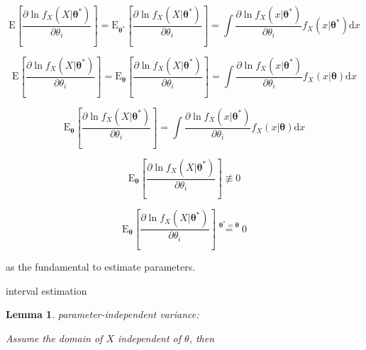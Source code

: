 \documentclass[
]{book}
\newtheorem{lemma}{Lemma}[chapter]
\theoremstyle{definition}
\theoremstyle{definition}
\theoremstyle{definition}
\theoremstyle{definition}
\theoremstyle{remark}
\begin{document}
\[
\mathrm{E}\left[\dfrac{\partial\ln f_{{\scriptscriptstyle X}}\left(X|\boldsymbol{\theta}^{*}\right)}{\partial\theta_{{\scriptscriptstyle i}}}\right]=\mathrm{E}_{{\scriptscriptstyle \boldsymbol{\theta}^{*}}}\left[\dfrac{\partial\ln f_{{\scriptscriptstyle X}}\left(X|\boldsymbol{\theta}^{*}\right)}{\partial\theta_{{\scriptscriptstyle i}}}\right]=\int\dfrac{\partial\ln f_{{\scriptscriptstyle X}}\left(x|\boldsymbol{\theta}^{*}\right)}{\partial\theta_{{\scriptscriptstyle i}}}f_{{\scriptscriptstyle X}}\left(x|\boldsymbol{\theta}^{*}\right)\mathrm{d}x
\]

\[
\mathrm{E}\left[\dfrac{\partial\ln f_{{\scriptscriptstyle X}}\left(X|\boldsymbol{\theta}^{*}\right)}{\partial\theta_{{\scriptscriptstyle i}}}\right]=\mathrm{E}_{{\scriptscriptstyle \boldsymbol{\theta}}}\left[\dfrac{\partial\ln f_{{\scriptscriptstyle X}}\left(X|\boldsymbol{\theta}^{*}\right)}{\partial\theta_{{\scriptscriptstyle i}}}\right]=\int\dfrac{\partial\ln f_{{\scriptscriptstyle X}}\left(x|\boldsymbol{\theta}^{*}\right)}{\partial\theta_{{\scriptscriptstyle i}}}f_{{\scriptscriptstyle X}}\left(x|\boldsymbol{\theta}\right)\mathrm{d}x
\]

\[
\mathrm{E}_{{\scriptscriptstyle \boldsymbol{\theta}}}\left[\dfrac{\partial\ln f_{{\scriptscriptstyle X}}\left(X|\boldsymbol{\theta}^{*}\right)}{\partial\theta_{{\scriptscriptstyle i}}}\right]=\int\dfrac{\partial\ln f_{{\scriptscriptstyle X}}\left(x|\boldsymbol{\theta}^{*}\right)}{\partial\theta_{{\scriptscriptstyle i}}}f_{{\scriptscriptstyle X}}\left(x|\boldsymbol{\theta}\right)\mathrm{d}x
\]

\[
\mathrm{E}_{{\scriptscriptstyle \boldsymbol{\theta}}}\left[\dfrac{\partial\ln f_{{\scriptscriptstyle X}}\left(X|\boldsymbol{\theta}^{*}\right)}{\partial\theta_{{\scriptscriptstyle i}}}\right]\not\equiv0
\]

\[
\mathrm{E}_{{\scriptscriptstyle \boldsymbol{\theta}}}\left[\dfrac{\partial\ln f_{{\scriptscriptstyle X}}\left(X|\boldsymbol{\theta}^{*}\right)}{\partial\theta_{{\scriptscriptstyle i}}}\right]\overset{\boldsymbol{\theta}^{*}=\boldsymbol{\theta}}{=}0
\]

as the fundamental to estimate parameters.

interval estimation

\begin{lemma}
\protect\hypertarget{lem:unnamed-chunk-37}{}\label{lem:unnamed-chunk-37}parameter-independent variance:

Assume the domain of \(X\) independent of \(\theta\), then
\end{lemma}
\end{document}
